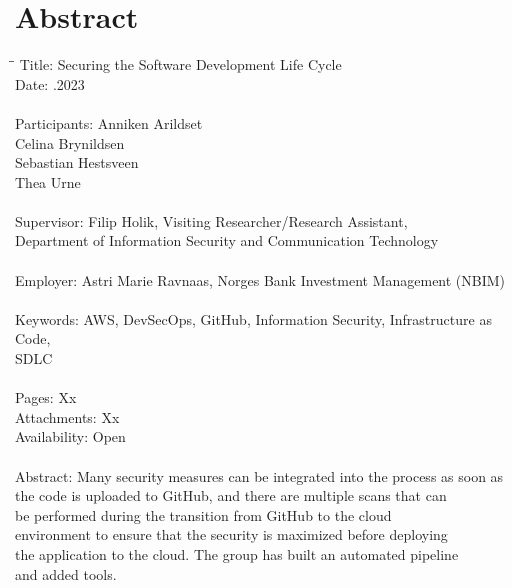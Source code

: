 \newpage
\thispagestyle{empty}
\mbox{}
\chapter*{Abstract}
{ %
\begin{tabbing}
\hspace{2cm}\=\hspace{1.5cm}\=\kill %
Title: \> \>Securing the Software Development Life Cycle \\
Date: \> .2023 \\ 
\\
Participants: \> \> Anniken Arildset \\ \> \> Celina Brynildsen \\ \> \> Sebastian Hestsveen \\ \> \> Thea Urne \\
\\
Supervisor: \> \> Filip Holik, Visiting Researcher/Research Assistant, \\\> \> Department of Information Security and Communication Technology \\
\\
Employer: \> \>  Astri Marie Ravnaas, Norges Bank Investment Management (NBIM) \\
\\
Keywords: \> \> AWS, DevSecOps, GitHub, Information Security, Infrastructure as Code,\\\> \> SDLC \\
\\
Pages: \> \> Xx \\
Attachments: \> \> Xx \\
Availability: \> \> Open \\
\\
Abstract: \> \> Many security measures can be integrated into the process as soon as\\ \> \> the  code is uploaded to GitHub, and there are multiple scans that can\\ \> \> be performed during the transition from GitHub to the cloud\\ \> \> environment to ensure that the security is maximized before deploying\\ \> \>  the application to the cloud. The group has built an automated pipeline \\ \> \>and added tools.
\end{tabbing}
}
